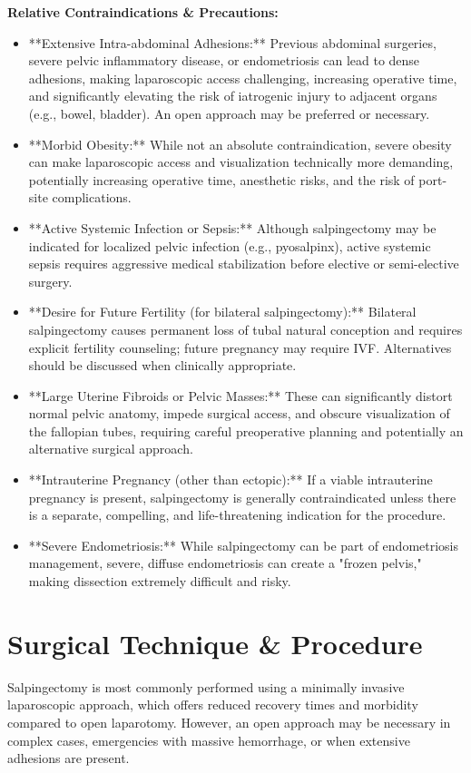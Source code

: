 \textbf{Relative Contraindications \& Precautions:}
\begin{itemize}
  \item **Extensive Intra-abdominal Adhesions:** Previous abdominal surgeries, severe pelvic inflammatory disease, or endometriosis can lead to dense adhesions, making laparoscopic access challenging, increasing operative time, and significantly elevating the risk of iatrogenic injury to adjacent organs (e.g., bowel, bladder). An open approach may be preferred or necessary.
  \item **Morbid Obesity:** While not an absolute contraindication, severe obesity can make laparoscopic access and visualization technically more demanding, potentially increasing operative time, anesthetic risks, and the risk of port-site complications.
  \item **Active Systemic Infection or Sepsis:** Although salpingectomy may be indicated for localized pelvic infection (e.g., pyosalpinx), active systemic sepsis requires aggressive medical stabilization before elective or semi-elective surgery.
  \item **Desire for Future Fertility (for bilateral salpingectomy):** Bilateral salpingectomy causes permanent loss of tubal natural conception and requires explicit fertility counseling; future pregnancy may require IVF. Alternatives should be discussed when clinically appropriate.
  \item **Large Uterine Fibroids or Pelvic Masses:** These can significantly distort normal pelvic anatomy, impede surgical access, and obscure visualization of the fallopian tubes, requiring careful preoperative planning and potentially an alternative surgical approach.
  \item **Intrauterine Pregnancy (other than ectopic):** If a viable intrauterine pregnancy is present, salpingectomy is generally contraindicated unless there is a separate, compelling, and life-threatening indication for the procedure.
  \item **Severe Endometriosis:** While salpingectomy can be part of endometriosis management, severe, diffuse endometriosis can create a "frozen pelvis," making dissection extremely difficult and risky.
\end{itemize}

\section*{Surgical Technique \& Procedure}
Salpingectomy is most commonly performed using a minimally invasive laparoscopic approach, which offers reduced recovery times and morbidity compared to open laparotomy. However, an open approach may be necessary in complex cases, emergencies with massive hemorrhage, or when extensive adhesions are present.

